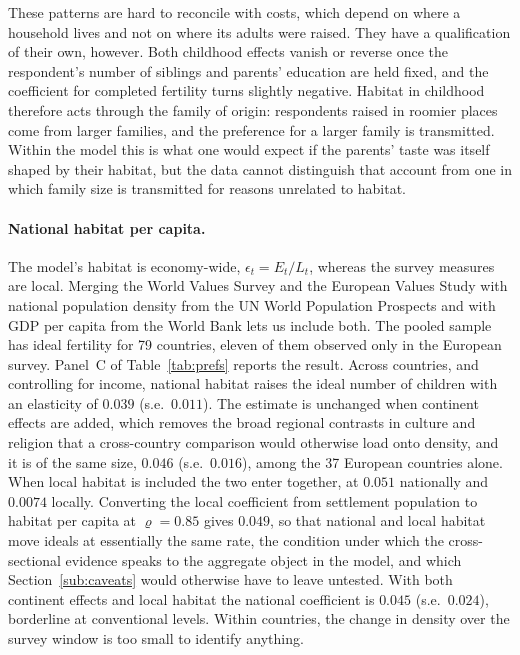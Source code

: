 \documentclass[11pt]{article}
\begin{document}
These patterns are hard to reconcile with costs, which depend on where a household lives and not
on where its adults were raised. They have a qualification of their own, however. Both childhood
effects vanish or reverse once the respondent's number of siblings and parents' education are held
fixed, and the coefficient for completed fertility turns slightly negative. Habitat in childhood therefore acts through the family of origin: respondents raised in
roomier places come from larger families, and the preference for a larger family is transmitted.
Within the model this is what one would expect if the parents' taste was itself shaped by their
habitat, but the data cannot distinguish that account from one in which family size is
transmitted for reasons unrelated to habitat.

\paragraph{National habitat per capita.}
The model's habitat is economy-wide, $\epsilon_t=E_t/L_t$, whereas the survey measures are local.
Merging the World Values Survey and the European Values Study with national population density from
the UN World Population Prospects and with GDP per capita from the World Bank lets us include both.
The pooled sample has ideal fertility for 79 countries, eleven of them observed only in the
European survey. Panel~C of Table~\ref{tab:prefs} reports the result. Across countries, and
controlling for income, national habitat raises the ideal number of children with an elasticity of
$0.039$ (s.e.\ $0.011$). The estimate is unchanged when continent effects are added, which removes
the broad regional contrasts in culture and religion that a cross-country comparison would
otherwise load onto density, and it is of the same size, $0.046$ (s.e.\ $0.016$), among the 37
European countries alone. When local habitat is included the two enter together, at $0.051$
nationally and $0.0074$ locally. Converting the local coefficient from settlement population to
habitat per capita at $\varrho=0.85$ gives $0.049$, so that national and local habitat move ideals
at essentially the same rate, the condition under which the cross-sectional evidence speaks to
the aggregate object in the model, and which Section~\ref{sub:caveats} would otherwise have to
leave untested. With both continent effects and local habitat the national coefficient is
$0.045$ (s.e.\ $0.024$), borderline at conventional levels. Within countries, the change in
density over the survey window is too small to identify anything.
\end{document}
